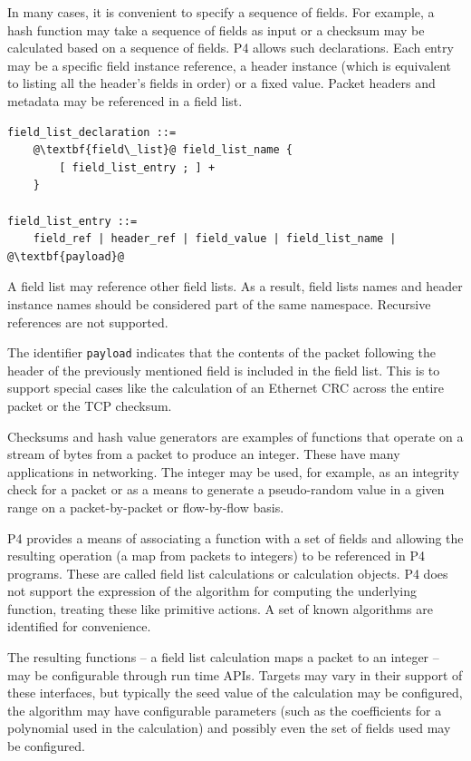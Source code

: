 \documentclass[12pt]{article}
\begin{document}

In many cases, it is convenient to specify a sequence of fields. For example,
a hash function may take a sequence of fields as input or a checksum may be
calculated based on a sequence of fields.  P4 allows such declarations. Each
entry may be a specific field instance reference, a header instance (which
is equivalent to listing all the header's fields in order) or a fixed value.
Packet headers and metadata may be referenced in a field list.

\begin{lstlisting}[frame=single,backgroundcolor=\color{bnfgreen},escapechar=\@]
field_list_declaration ::=
    @\textbf{field\_list}@ field_list_name {
        [ field_list_entry ; ] +
    }

field_list_entry ::=
    field_ref | header_ref | field_value | field_list_name | @\textbf{payload}@
\end{lstlisting}


A field list may reference other field lists. As a result, field lists names
and header instance names should be considered part of the same namespace.
Recursive references are not supported.

The identifier \texttt{payload} indicates that the contents of the
packet following the header of the previously mentioned field is
included in the field list.  This is to support special cases like the
calculation of an Ethernet CRC across the entire packet or the TCP
checksum.


Checksums and hash value generators are examples of functions that operate on a
stream of bytes from a packet to produce an integer. These have many
applications in networking. The integer may be used, for example, as an
integrity check for a packet or as a means to generate a pseudo-random value in
a given range on a packet-by-packet or flow-by-flow basis.

P4 provides a means of associating a function with a set of fields and
allowing the resulting operation (a map from packets to integers) to
be referenced in P4 programs.  These are called field list
calculations or calculation objects.  P4 does not support the
expression of the algorithm for computing the underlying function,
treating these like primitive actions. A set of known algorithms are
identified for convenience.

The resulting functions -- a field list calculation maps a packet to
an integer -- may be configurable through run time APIs. Targets may
vary in their support of these interfaces, but typically the seed
value of the calculation may be configured, the algorithm may have
configurable parameters (such as the coefficients for a polynomial
used in the calculation) and possibly even the set of fields used may
be configured.
\end{document}
